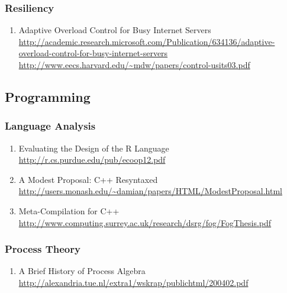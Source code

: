 \documentclass{article}
\begin{document}
\subsubsection{Resiliency}


\begin{enumerate}
	\item {Adaptive Overload Control for Busy Internet Servers\\
\href{http://academic.research.microsoft.com/Publication/634136/adaptive-overload-control-for-busy-internet-servers}{http://academic.research.microsoft.com/Publication/634136/adaptive-overload-control-for-busy-internet-servers}\\
\url{http://www.eecs.harvard.edu/~mdw/papers/control-usits03.pdf}}
\end{enumerate}


\subsection{Programming}
\subsubsection{Language Analysis}
\begin{enumerate}
	\item {Evaluating the Design of the R Language\\ \url{http://r.cs.purdue.edu/pub/ecoop12.pdf}}
	\item{A Modest Proposal: C++ Resyntaxed\\
\url{http://users.monash.edu/~damian/papers/HTML/ModestProposal.html}}
	\item{Meta-Compilation for C++\\
\url{http://www.computing.surrey.ac.uk/research/dsrg/fog/FogThesis.pdf}}
\end{enumerate}
\subsubsection{Process Theory}
\begin{enumerate}
	\item {A Brief History of Process Algebra\\
\url{http://alexandria.tue.nl/extra1/wskrap/publichtml/200402.pdf}}
\end{enumerate}
\end{document}
